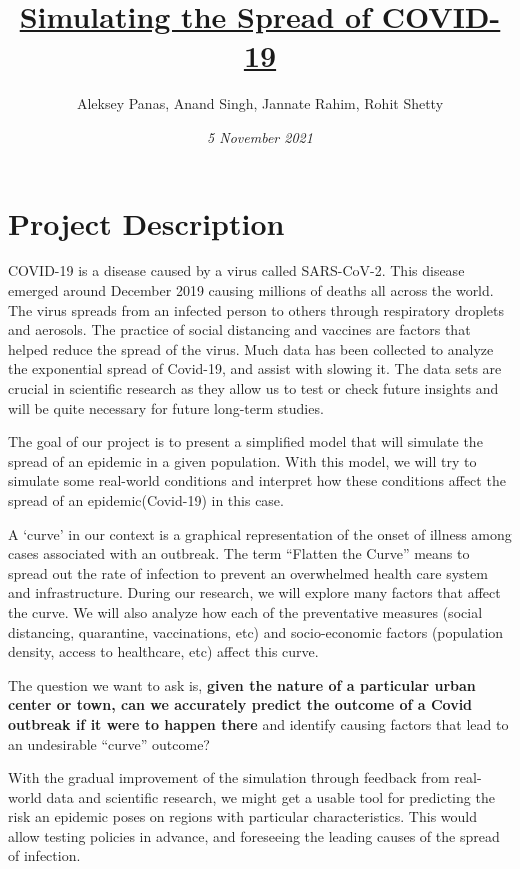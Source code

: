 \documentclass{article}
\title{\textbf{\underline{Simulating the Spread of COVID-19}}}
\author{Aleksey Panas, Anand Singh, Jannate Rahim, Rohit Shetty}
\date{\emph{5 November 2021}}
\begin{document}
    \maketitle


    \section{Project Description}

    COVID-19 is a disease caused by a virus called SARS-CoV-2. This disease emerged around December 2019 causing millions of deaths all across the world. The virus spreads from an infected person to others through respiratory droplets and aerosols. The practice of social distancing and vaccines are factors that helped reduce the spread of the virus. Much data has been collected to analyze the exponential spread of Covid-19, and assist with slowing it. The data sets are crucial in scientific research as they allow us to test or check future insights and will be quite necessary for future long-term studies.
    \bigskip

    The goal of our project is to present a simplified model that will simulate the spread of an epidemic in a given population. With this model, we will try to simulate some real-world conditions and interpret how these conditions affect the spread of an epidemic(Covid-19) in this case.
    \bigskip

    A ‘curve’ in our context is a graphical representation of the onset of illness among cases associated with an outbreak.
    The term “Flatten the Curve” means to spread out the rate of infection to prevent an overwhelmed health care system and infrastructure. During our research, we will explore many factors that affect the curve. We will also analyze how each of the preventative measures (social distancing, quarantine, vaccinations, etc) and socio-economic factors (population density, access to healthcare, etc) affect this curve.
    \bigskip

    The question we want to ask is, \textbf{given the nature of a particular urban center or town, can we accurately predict the outcome of a Covid outbreak if it were to happen there} and identify causing factors that lead to an undesirable “curve” outcome?

    \bigskip
    With the gradual improvement of the simulation through feedback from real-world data and scientific research, we might get a usable tool for predicting the risk an epidemic poses on regions with particular characteristics. This would allow testing policies in advance, and foreseeing the leading causes of the spread of infection.
\end{document}
